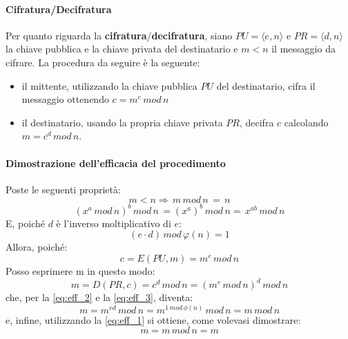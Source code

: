 \paragraph{Cifratura/Decifratura}
Per quanto riguarda la \textbf{cifratura}/\textbf{decifratura}, siano $PU = \langle e,n \rangle$ e $PR = \langle d,n \rangle$ la chiave pubblica e la chiave privata del destinatario e $m < n$ il messaggio da cifrare. La procedura da seguire è la seguente: 
\begin{itemize}
\item il mittente, utilizzando la chiave pubblica $PU$ del destinatario, cifra il messaggio ottenendo $c = m^e \, mod \, n$
\item il destinatario, usando la propria chiave privata $PR$, decifra $c$ calcolando $m = c^d \, mod \, n$. \end{itemize}

\paragraph{Dimostrazione dell'efficacia del procedimento}
Poste le seguenti proprietà: 
\begin{equation}\label{eq:eff_1}
m<n \Rightarrow \, m \, mod \, n\,=\,n
\end{equation}
\begin{equation} \label{eq:eff_2}
(x^a \, mod \, n)^b \, mod \, n \, =  (x^{a})^b \, mod \, n =  \, x^{ab} \, mod \, n
\end{equation}
E, poiché $d$ è l'inverso moltiplicativo di $e$:
\begin{equation} \label{eq:eff_3}
(e \cdot d) \, mod \, \varphi(n) = 1
\end{equation}
Allora, poiché:
\begin{equation}
c=E(PU,m) = m^e \, mod \, n
\end{equation}
Posso esprimere m in questo modo:
\begin{equation}
m=D(PR,c) = c^d \, mod \, n = (m^e \, mod \, n)^d \, mod \, n
\end{equation}
che, per la \ref{eq:eff_2} e la \ref{eq:eff_3}, diventa:
\begin{equation}
m =  m^{ed} \, mod \, n = m^{1 \, mod \, \phi(n)} \, mod \, n = m \, mod \, n
\end{equation}
e, infine, utilizzando la \ref{eq:eff_1} si ottiene, come volevasi dimostrare:
\begin{equation}
m = m \, mod \, n = m
\end{equation}

